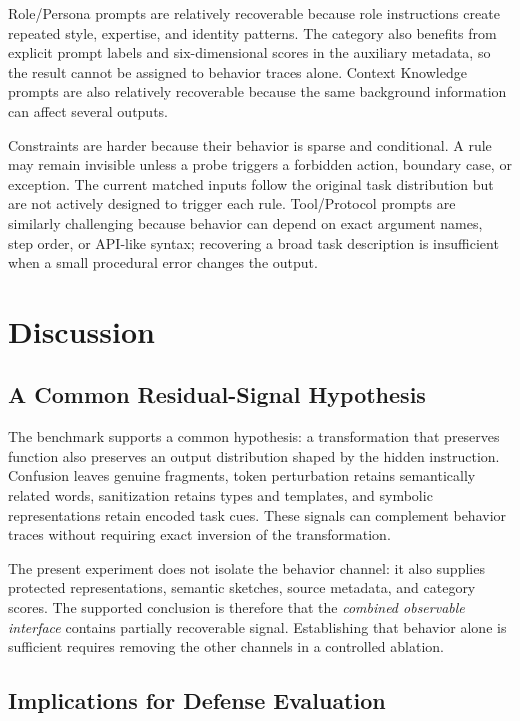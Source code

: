 \documentclass[letterpaper]{article} %
\begin{document}
Role/Persona prompts are relatively recoverable because role instructions create repeated style, expertise, and identity patterns.  The category also benefits from explicit prompt labels and six-dimensional scores in the auxiliary metadata, so the result cannot be assigned to behavior traces alone.  Context Knowledge prompts are also relatively recoverable because the same background information can affect several outputs.

Constraints are harder because their behavior is sparse and conditional.  A rule may remain invisible unless a probe triggers a forbidden action, boundary case, or exception.  The current matched inputs follow the original task distribution but are not actively designed to trigger each rule.  Tool/Protocol prompts are similarly challenging because behavior can depend on exact argument names, step order, or API-like syntax; recovering a broad task description is insufficient when a small procedural error changes the output.

\section{Discussion}

\subsection{A Common Residual-Signal Hypothesis}

The benchmark supports a common hypothesis: a transformation that preserves function also preserves an output distribution shaped by the hidden instruction.  Confusion leaves genuine fragments, token perturbation retains semantically related words, sanitization retains types and templates, and symbolic representations retain encoded task cues.  These signals can complement behavior traces without requiring exact inversion of the transformation.

The present experiment does not isolate the behavior channel: it also supplies protected representations, semantic sketches, source metadata, and category scores.  The supported conclusion is therefore that the \emph{combined observable interface} contains partially recoverable signal.  Establishing that behavior alone is sufficient requires removing the other channels in a controlled ablation.

\subsection{Implications for Defense Evaluation}
\end{document}
